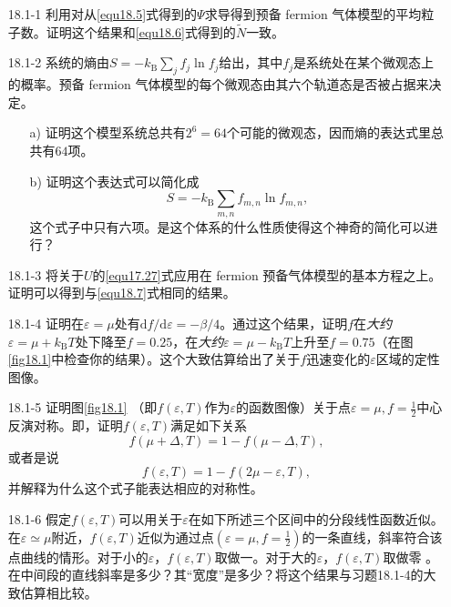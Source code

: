 \begin{itemize}
\item[18.1-1] 利用对从\eqref{equ18.5}式得到的$\Psi$求导得到预备 fermion 气体模型的平均粒子数。证明这个结果和\eqref{equ18.6}式得到的$\tilde N$一致。
\item[18.1-2] 系统的熵由$S=-k_\text{B}\sum_jf_j\ln f_j$给出，其中$f_j$是系统处在某个微观态上的概率。预备 fermion 气体模型的每个微观态由其六个轨道态是否被占据来决定。
	\begin{itemize}
	\item[a)] 证明这个模型系统总共有$2^{6}=64$个可能的微观态，因而熵的表达式里总共有$64$项。
	\item[b)] 证明这个表达式可以简化成
	\begin{equation*}
	S=-k_\text{B}\sum_{m,n}f_{m,n}\ln f_{m,n},
	\end{equation*}
	这个式子中只有六项。是这个体系的什么性质使得这个神奇的简化可以进行？
	\end{itemize}
\item[18.1-3] 将关于$U$的\eqref{equ17.27}式应用在 fermion 预备气体模型的基本方程之上。证明可以得到与\eqref{equ18.7}式相同的结果。
\item[18.1-4] 证明在$\varepsilon=\mu$处有$\mathrm df/\mathrm d\varepsilon=-\beta/4$。通过这个结果，证明$f$在{\it 大约}$\varepsilon=\mu+k_\text{B}T$处下降至$f=0.25$，在{\it 大约}$\varepsilon=\mu-k_\text{B}T$上升至$f=0.75$（在图\ref{fig18.1}中检查你的结果）。这个大致估算给出了关于$f$迅速变化的$\varepsilon$区域的定性图像。
\item[18.1-5] 证明图\ref{fig18.1}%
%
（即$f(\varepsilon,T)$作为$\varepsilon$的函数图像）关于点$\varepsilon=\mu,f=\frac{1}{2}$中心反演对称。即，证明$f(\varepsilon,T)$满足如下关系
\begin{equation*}
f(\mu+\Delta,T)=1-f(\mu-\Delta,T),
\end{equation*}
或者是说
\begin{equation*}
f(\varepsilon,T)=1-f(2\mu-\varepsilon,T),
\end{equation*}
并解释为什么这个式子能表达相应的对称性。
\item[18.1-6] 假定$f(\varepsilon,T)$可以用关于$\varepsilon$在如下所述三个区间中的分段线性函数近似。在$\varepsilon\simeq\mu$附近，$f(\varepsilon,T)$近似为通过点$(\varepsilon=\mu,f=\frac{1}{2})$的一条直线，斜率符合该点曲线的情形。对于小的$\varepsilon$，$f(\varepsilon,T)$取做一。对于大的$\varepsilon$，$f(\varepsilon,T)$取做零%
%
。\\
在中间段的直线斜率是多少？其``宽度''是多少？将这个结果与习题18.1-4的大致估算相比较。
\end{itemize}

